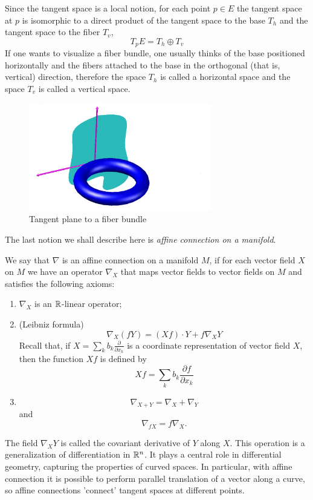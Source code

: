 Since the tangent space is a local notion, for each point $p \in E$
the tangent space at $p$ is isomorphic to a direct product
of the tangent space to the base $T_h$ and the tangent space to the fiber $T_v$,
\begin{equation}
    T_p E = T_h \oplus T_v
\end{equation}
If one wants to visualize a fiber bundle,
one usually thinks of the base positioned horizontally and the fibers
attached to the base in the orthogonal (that is, vertical) direction,
therefore the space $T_h$ is called a horizontal space and the space $T_v$
is called a vertical space.

\begin{figure}
        \centering
                \includegraphics[width=8cm]{images/torus_tangent.jpg}
        \caption{Tangent plane to a fiber bundle}
        \label{fig:torus_tangent}
\end{figure}


The last notion we shall describe here is \textit{affine connection on a manifold}.

We say that $\nabla$ is an affine connection on a manifold $M$,
if for each vector field $X$ on $M$ we have an operator $\nabla_X$ that
maps vector fields to vector fields on $M$ and satisfies 
the following axioms:
\begin{enumerate}
    \item $\nabla_X$ is an $\mathbb{R}$-linear operator;
    \item (Leibniz formula) $$\nabla_X(fY) = (Xf) \cdot Y + f \nabla_X Y $$
        Recall that, if $X = \sum_k b_k \frac{\partial}{\partial x_k}$ is a coordinate representation 
        of vector field $X$, then the function
        $Xf$ is defined by
        $$Xf = \sum_k b_k \frac{\partial f}{\partial x_k}$$
    \item $$ \nabla_{X + Y} = \nabla_X + \nabla_Y $$
        and
        $$ \nabla_{fX} = f \nabla_X.$$
\end{enumerate}
The field $\nabla_{X} Y$ is called the covariant derivative of $Y$ along $X$.
This operation is a generalization of differentiation in $\mathbb{R}^n$.
It plays a central role in differential geometry,
capturing the properties of curved spaces. In particular,
with affine connection it is possible to perform
parallel translation of a vector along a curve, so
affine connections 'connect' tangent
spaces at different points.


